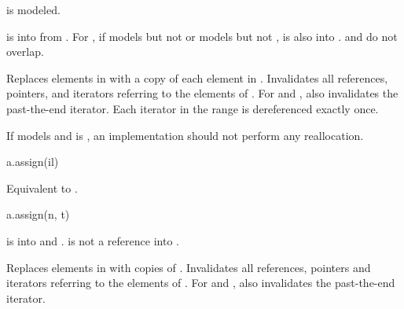 \begin{itemdescr}
\pnum
\result
{}

\pnum
\mandates
{}
is modeled.

\pnum
\expects
{} is  into 
from .
For ,
if  models
but not  or models
but not ,
 is also  into .
 and  do not overlap.

\pnum
\effects
Replaces elements in  with a copy of each element in .
Invalidates all references, pointers, and iterators
referring to the elements of .
For  and ,
also invalidates the past-the-end iterator.
Each iterator in the range  is dereferenced exactly once.

\pnum
\recommended
If  models  and
 is ,
an implementation should not perform any reallocation.
\end{itemdescr}

\begin{itemdecl}
a.assign(il)
\end{itemdecl}

\begin{itemdescr}
\pnum
\effects
Equivalent to .
\end{itemdescr}

\begin{itemdecl}
a.assign(n, t)
\end{itemdecl}

\begin{itemdescr}
\pnum
\result
{}

\pnum
\expects
{} is  into 
and .
 is not a reference into .

\pnum
\effects
Replaces elements in  with  copies of .
Invalidates all references, pointers and iterators
referring to the elements of .
For  and ,
also invalidates the past-the-end iterator.
\end{itemdescr}

